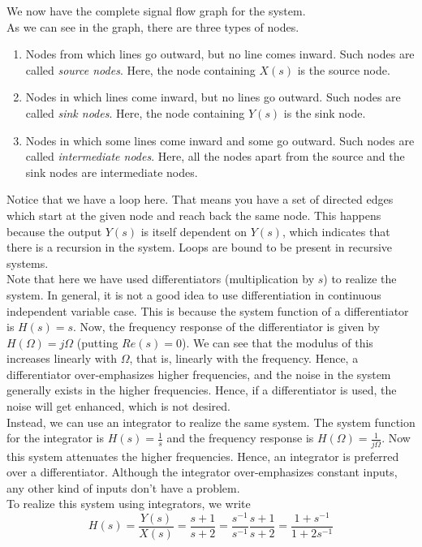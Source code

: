 We now have the complete signal flow graph for the system.\\
As we can see in the graph, there are three types of nodes.
\begin{enumerate}
\item Nodes from which lines go outward, but no line comes inward. Such nodes are called \textit{source nodes}. Here, the node containing $X(s)$ is the source node.
\item Nodes in which lines come inward, but no lines go outward. Such nodes are called \textit{sink nodes}. Here, the node containing $Y(s)$ is the sink node.
\item Nodes in which some lines come inward and some go outward. Such nodes are called \textit{intermediate nodes}. Here, all the nodes apart from the source and the sink nodes are intermediate nodes.
\end{enumerate}
Notice that we have a loop here. That means you have a set of directed edges which start at the given node and reach back the same node. This happens because the output $Y(s)$ is itself dependent on $Y(s)$, which indicates that there is a recursion in the system. Loops are bound to be present in recursive systems.\\
Note that here we have used differentiators (multiplication by $s$) to realize the system. In general, it is not a good idea to use differentiation in continuous independent variable case. This is because the system function of a differentiator is $H(s)=s$. Now, the frequency response of the differentiator is  given by $H(\Omega)=j\Omega$ (putting $Re(s)=0$). We can see that the modulus of this increases linearly with $\Omega$, that is, linearly with the frequency. Hence, a differentiator over-emphasizes higher frequencies, and the noise in the system generally exists in the higher frequencies. Hence, if a differentiator is used, the noise will get enhanced, which is not desired.\\
Instead, we can use an integrator to realize the same system. The system function for the integrator is $H(s)=\frac{1}{s}$ and the frequency response is $H(\Omega)=\frac{1}{j\Omega}$. Now this system attenuates the higher frequencies. Hence, an integrator is preferred over a differentiator. Although the integrator over-emphasizes constant inputs, any other kind of inputs don't have a problem.\\
To realize this system using integrators, we write
\[
H(s) = \frac{Y(s)}{X(s)} = \frac{s+1}{s+2}=\frac{s^{-1}}{s^{-1}}\frac{s+1}{s+2} = \frac{1+s^{-1}}{1+2s^{-1}}
\]
